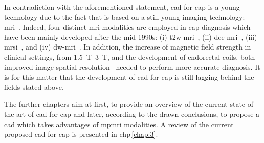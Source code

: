 In contradiction with the aforementioned statement, \ac{cad} for \ac{cap} is a young technology due to the fact that is based on a still young imaging technology: \ac{mri}~\cite{Hegde2013}.
Indeed, four distinct \ac{mri} modalities are employed in \ac{cap} diagnosis which have been mainly developed after the mid-1990s: (i) \ac{t2w}-\ac{mri}~\cite{Hricak1983}, (ii) \ac{dce}-\ac{mri}~\cite{HuchBoni1995}, (iii) \ac{mrsi}~\cite{Kurhanewicz1996}, and (iv) \ac{dw}-\ac{mri}~\cite{Scheidler1999}.
In addition, the increase of magnetic field strength in clinical settings, from \SIrange{1.5}{3}{\tesla}, and the development of endorectal coils, both improved image spatial resolution~\cite{Swanson2001} needed to perform more accurate diagnosis.
It is for this matter that the development of \ac{cad} for \ac{cap} is still lagging behind the fields stated above.

The further chapters aim at first, to provide an overview of the current state-of-the-art of \ac{cad} for \ac{cap} and later, according to the drawn conclusions, to propose a \ac{cad} which takes advantages of \ac{mpmri} modalities. 
A review of the current proposed \ac{cad} for \ac{cap} is presented in \acs{chp}\,\ref{chap:3}.

 



